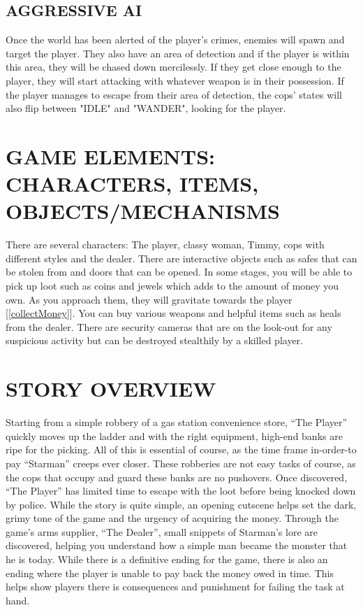 \documentclass{article}
\begin{document}
\bigbreak
\subsection{AGGRESSIVE AI \label{aggAI}}
Once the world has been alerted of the player's crimes, enemies will spawn and target the player. They also have an area of detection and if the player is within this area, they will be chased down mercilessly. If they get close enough to the player, they will start attacking with whatever weapon is in their possession. If the player manages to escape from their area of detection, the cops' states will also flip between "IDLE" and "WANDER", looking for the player.

\section{GAME ELEMENTS: CHARACTERS, ITEMS, OBJECTS/MECHANISMS \label{elements}}
There are several characters: The player, classy woman, Timmy, cops with different styles and the dealer. There are interactive objects such as safes that can be stolen from and doors that can be opened. In some stages, you will be able to pick up loot such as coins and jewels which adds to the amount of money you own. As you approach them, they will gravitate towards the player [\ref{collectMoney}]. You can buy various weapons and helpful items such as heals from the dealer. There are security cameras that are on the look-out for any suspicious activity but can be destroyed stealthily by a skilled player.

\section{STORY OVERVIEW \label{storyover}}
Starting from a simple robbery of a gas station convenience store, “The Player” quickly moves up the ladder and with the right equipment, high-end banks are ripe for the picking. All of this is essential of course, as the time frame in-order-to pay “Starman” creeps ever closer. 
\bigbreak
These robberies are not easy tasks of course, as the cops that occupy and guard these banks are no pushovers. Once discovered, “The Player” has limited time to escape with the loot before being knocked down by police.
\bigbreak
While the story is quite simple, an opening cutscene helps set the dark, grimy tone of the game and the urgency of acquiring the money. Through the game's arms supplier, “The Dealer”, small snippets of Starman's lore are discovered, helping you understand how a simple man became the monster that he is today.
\bigbreak
While there is a definitive ending for the game, there is also an ending where the player is unable to pay back the money owed in time. This helps show players there is consequences and punishment for failing the task at hand.
\end{document}
